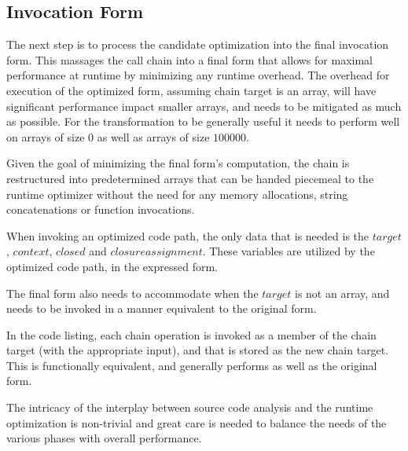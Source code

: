\subsection{Invocation Form}
The next step is to process the candidate optimization into the final invocation form.  This massages the call chain into a final form that allows for maximal performance at runtime by minimizing any runtime overhead.  The overhead for execution of the optimized form, assuming chain target is an array, will have significant performance impact smaller arrays, and needs to be mitigated as much as possible.  For the transformation to be generally useful it needs to perform well on arrays of size $0$ as well as arrays of size $100000$.  

\begin{minipage}{\linewidth}

\end{minipage}

Given the goal of minimizing the final form's computation, the chain is restructured into predetermined arrays that can be handed piecemeal to the runtime optimizer without the need for any memory allocations, string concatenations or function invocations.

When invoking an optimized code path, the only data that is needed is the $target$, $context$, $closed$ and $closure assignment$.  These variables are utilized by the optimized code path, in the expressed form. 

The final form also needs to accommodate when the $target$ is not an array, and needs to be invoked in a manner equivalent to the original form.  \\

\begin{minipage}{\linewidth}

\end{minipage}

In the code listing, each chain operation is invoked as a member of the chain target (with the appropriate input), and that is stored as the new chain target.  This is functionally equivalent, and generally performs as well as the original form. %




The intricacy of the interplay between source code analysis and the runtime optimization is non-trivial and great care is needed to balance the needs of the various phases with overall performance.  